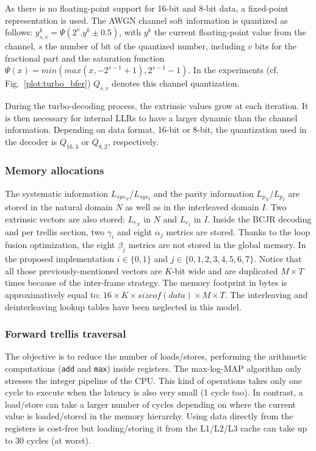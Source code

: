As there is no floating-point support for 16-bit and 8-bit data, a fixed-point
representation is used. The AWGN channel soft information is quantized as
follows: $y_{s,v}^k = \Psi(2^v . y^k \pm 0.5)$, with $y^k$ the current
floating-point value from the channel, $s$ the number of bit of the quantized
number, including $v$ bits for the fractional part and the saturation function
$\Psi(x) = min(max(x, -2^{s-1} +1), 2^{s-1} -1)$. In the experiments
(cf. Fig.~\ref{plot:turbo_bfer}) $Q_{s,v}$ denotes this channel quantization.

During the turbo-decoding process, the extrinsic values grow at each iteration.
It is then necessary for internal LLRs to have a larger dynamic than the channel
information. Depending on data format, 16-bit or 8-bit, the quantization used in
the decoder is $Q_{16,3}$ or $Q_{8,2}$, respectively.

\subsubsection{Memory allocations}

The systematic information $L_{sys_N}$/$L_{sys_I}$ and the parity information
$L_{p_N}$/$L_{p_I}$  are stored in the natural domain $N$ as well as in the
interleaved domain $I$. Two extrinsic vectors are also stored: $L_{e_N}$ in $N$
and $L_{e_I}$ in $I$. Inside the BCJR decoding and per trellis section, two
$\gamma_{i}$ and eight $\alpha_{j}$ metrics are stored. Thanks to the loop
fusion optimization, the eight $\beta_j$ metrics are not stored in the global
memory. In the proposed implementation $i \in \{0,1\}$ and
$j \in \{0,1,2,3,4,5,6,7\}$. Notice that all those previously-mentioned vectors
are $K$-bit wide and are duplicated $M\times T$ times because of the inter-frame
strategy. The memory footprint in bytes is approximatively equal to:
$16 \times K \times sizeof(data) \times M \times T$.
The interleaving and deinterleaving lookup tables have been neglected in this
model.

\subsubsection{Forward trellis traversal}

The objective is to reduce the number of loads/stores, performing the arithmetic
computations (\verb|add| and \verb|max|) inside registers. The max-log-MAP
algorithm only stresses the integer pipeline of the CPU. This kind of operations
takes only one cycle to execute when the latency is also very small (1 cycle
too). In contrast, a load/store can take a larger number of cycles depending on
where the current value is loaded/stored in the memory hierarchy. Using data
directly from the registers is cost-free but loading/storing it from the
L1/L2/L3 cache can take up to 30 cycles (at worst).

